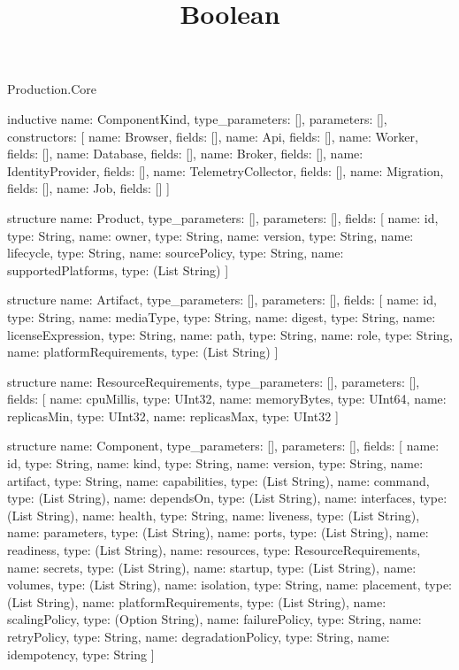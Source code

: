 \begin{lexlean}{Production.Core}
\title{Boolean}
\begin{semanticmodule}
inductive{
  name: ComponentKind,
  type_parameters: [],
  parameters: [],
  constructors: [
    {name: Browser, fields: []},
    {name: Api, fields: []},
    {name: Worker, fields: []},
    {name: Database, fields: []},
    {name: Broker, fields: []},
    {name: IdentityProvider, fields: []},
    {name: TelemetryCollector, fields: []},
    {name: Migration, fields: []},
    {name: Job, fields: []}
  ]
}

structure{
  name: Product,
  type_parameters: [],
  parameters: [],
  fields: [
    {name: id, type: String},
    {name: owner, type: String},
    {name: version, type: String},
    {name: lifecycle, type: String},
    {name: sourcePolicy, type: String},
    {name: supportedPlatforms, type: (List String)}
  ]
}

structure{
  name: Artifact,
  type_parameters: [],
  parameters: [],
  fields: [
    {name: id, type: String},
    {name: mediaType, type: String},
    {name: digest, type: String},
    {name: licenseExpression, type: String},
    {name: path, type: String},
    {name: role, type: String},
    {name: platformRequirements, type: (List String)}
  ]
}

structure{
  name: ResourceRequirements,
  type_parameters: [],
  parameters: [],
  fields: [
    {name: cpuMillis, type: UInt32},
    {name: memoryBytes, type: UInt64},
    {name: replicasMin, type: UInt32},
    {name: replicasMax, type: UInt32}
  ]
}

structure{
  name: Component,
  type_parameters: [],
  parameters: [],
  fields: [
    {name: id, type: String},
    {name: kind, type: String},
    {name: version, type: String},
    {name: artifact, type: String},
    {name: capabilities, type: (List String)},
    {name: command, type: (List String)},
    {name: dependsOn, type: (List String)},
    {name: interfaces, type: (List String)},
    {name: health, type: String},
    {name: liveness, type: (List String)},
    {name: parameters, type: (List String)},
    {name: ports, type: (List String)},
    {name: readiness, type: (List String)},
    {name: resources, type: ResourceRequirements},
    {name: secrets, type: (List String)},
    {name: startup, type: (List String)},
    {name: volumes, type: (List String)},
    {name: isolation, type: String},
    {name: placement, type: (List String)},
    {name: platformRequirements, type: (List String)},
    {name: scalingPolicy, type: (Option String)},
    {name: failurePolicy, type: String},
    {name: retryPolicy, type: String},
    {name: degradationPolicy, type: String},
    {name: idempotency, type: String}
  ]
}


\end{semanticmodule}
\end{lexlean}
